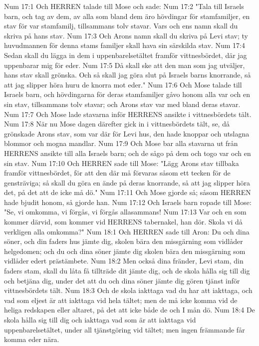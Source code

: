 Num 17:1  Och HERREN talade till Mose och sade:
Num 17:2  "Tala till Israels barn, och tag av dem, av alla som bland dem äro hövdingar för stamfamiljer, en stav för var stamfamilj, tillsammans tolv stavar. Vars och ens namn skall du skriva på hans stav.
Num 17:3  Och Arons namn skall du skriva på Levi stav; ty huvudmannen för denna stams familjer skall hava sin särskilda stav.
Num 17:4  Sedan skall du lägga in dem i uppenbarelsetältet framför vittnesbördet, där jag uppenbarar mig för eder.
Num 17:5  Då skall ske att den man som jag utväljer, hans stav skall grönska. Och så skall jag göra slut på Israels barns knorrande, så att jag slipper höra huru de knorra mot eder."
Num 17:6  Och Mose talade till Israels barn, och hövdingarna för deras stamfamiljer gåvo honom alla var och en sin stav, tillsammans tolv stavar; och Arons stav var med bland deras stavar.
Num 17:7  Och Mose lade stavarna inför HERRENS ansikte i vittnesbördets tält.
Num 17:8  När nu Mose dagen därefter gick in i vittnesbördets tält, se, då grönskade Arons stav, som var där för Levi hus, den hade knoppar och utslagna blommor och mogna mandlar.
Num 17:9  Och Mose bar alla stavarna ut från HERRENS ansikte till alla Israels barn; och de sågo på dem och togo var och en sin stav.
Num 17:10  Och HERREN sade till Mose: "Lägg Arons stav tillbaka framför vittnesbördet, för att den där må förvaras såsom ett tecken för de gensträviga; så skall du göra en ände på deras knorrande, så att jag slipper höra det, på det att de icke må dö."
Num 17:11  Och Mose gjorde så; såsom HERREN hade bjudit honom, så gjorde han.
Num 17:12  Och Israels barn ropade till Mose: "Se, vi omkomma, vi förgås, vi förgås allasammans!
Num 17:13  Var och en som kommer därvid, som kommer vid HERRENS tabernakel, han dör. Skola vi då verkligen alla omkomma?"
Num 18:1  Och HERREN sade till Aron: Du och dina söner, och din faders hus jämte dig, skolen bära den missgärning som vidlåder helgedomen; och du och dina söner jämte dig skolen bära den missgärning som vidlåder edert prästämbete.
Num 18:2  Men också dina fränder, Levi stam, din faders stam, skall du låta få tillträde dit jämte dig, och de skola hålla sig till dig och betjäna dig, under det att du och dina söner jämte dig gören tjänst inför vittnesbördets tält.
Num 18:3  Och de skola iakttaga vad du har att iakttaga, och vad som eljest är att iakttaga vid hela tältet; men de må icke komma vid de heliga redskapen eller altaret, på det att icke både de och I mån dö.
Num 18:4  De skola hålla sig till dig och iakttaga vad som är att iakttaga vid uppenbarelsetältet, under all tjänstgöring vid tältet; men ingen främmande får komma eder nära.
